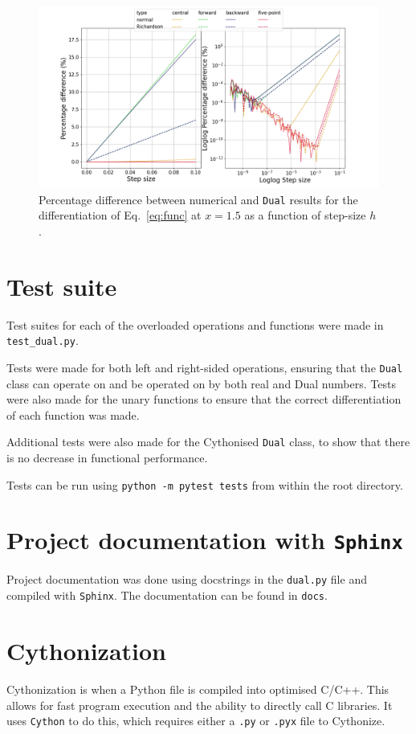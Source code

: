 \documentclass[11pt,a4paper]{article}
\begin{document}
\begin{figure}
    \centering
    \includegraphics[width=\columnwidth, keepaspectratio]{../percentage_difference.png}
    \caption{Percentage difference between numerical and \texttt{Dual} results for the differentiation of Eq.~\ref{eq:func} at $x=1.5$ as a function of step-size $h$.}
    \label{fig:pdiff}
\end{figure}

\section{Test suite}
Test suites for each of the overloaded operations and functions were made in \texttt{test\_dual.py}.

Tests were made for both left and right-sided operations, ensuring that the \texttt{Dual} class can operate on and be operated on by both real and Dual numbers. Tests were also made for the unary functions to ensure that the correct differentiation of each function was made.

Additional tests were also made for the Cythonised \texttt{Dual} class, to show that there is no decrease in functional performance.

Tests can be run using \texttt{python -m pytest tests} from within the root directory.

\section{Project documentation with \texttt{\textbf{Sphinx}}}
Project documentation was done using docstrings in the \texttt{dual.py} file and compiled with \texttt{Sphinx}. The documentation can be found in \texttt{docs}.

\section{Cythonization}
Cythonization is when a Python file is compiled into optimised C/C++. This allows for fast program execution and the ability to directly call C libraries. It uses \texttt{Cython} to do this, which requires either a \texttt{.py} or \texttt{.pyx} file to Cythonize.
\end{document}
